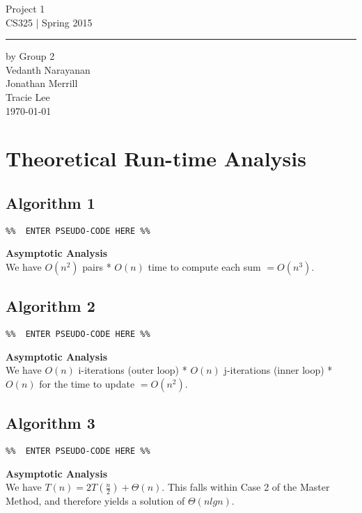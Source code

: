\documentclass[11pt,letterpaper]{article}
\begin{document}
\begin{titlepage}
    \vspace*{4cm}
    \begin{flushright}
    {\huge
        Project 1\\[5mm]
    }
    {\large
        CS325 | Spring 2015
     }
    \end{flushright}
\hrule
    \begin{flushright}
	by Group 2\\
	Vedanth Narayanan\\
	Jonathan Merrill\\
	Tracie Lee\\
    \vfill
	\today\\
    \end{flushright}
\end{titlepage}

\raggedright

\section{Theoretical Run-time Analysis}

\subsection{Algorithm 1}
\begin{verbatim}
%%  ENTER PSEUDO-CODE HERE %%
\end{verbatim}
\textbf{Asymptotic Analysis}\\
We have $O(n^2)$ pairs * $O(n)$ time to compute each sum $= O(n^3)$.

\subsection{Algorithm 2}
\begin{verbatim}
%%  ENTER PSEUDO-CODE HERE %%
\end{verbatim}
\textbf{Asymptotic Analysis}\\
We have $O(n)$ i-iterations (outer loop) * $O(n)$ j-iterations (inner loop) * $O(n)$ for the time to update $= O(n^2)$.

\subsection{Algorithm 3}
\begin{verbatim}
%%  ENTER PSEUDO-CODE HERE %%
\end{verbatim}
\textbf{Asymptotic Analysis}\\
We have $T(n) = 2T(\frac{n}{2}) + \Theta(n)$. This falls within Case 2 of the Master Method, and therefore yields a solution of $\Theta(nlgn)$.
\end{document}

